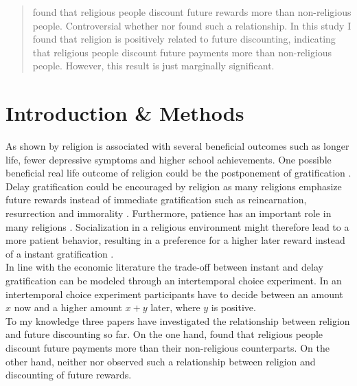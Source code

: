 \documentclass[10pt,a4paper]{article}
\begin{document}

\newpage



\begin{abstract}
\textcite{carter2012religious} found that religious people discount future rewards more than non-religious people. 
Controversial whether \textcite{thornton2015divine} nor \textcite{benjamin2010religious} found such a relationship. In this study I found that religion is positively related to future discounting, indicating that religious people discount future payments more than non-religious people. However, this result is just marginally significant.
\end{abstract}
 

\section{Introduction \& Methods}
As shown by \textcite{mccullough2013religion} religion is associated with several beneficial outcomes such as longer life, fewer depressive symptoms and higher school achievements. One possible beneficial real life outcome of religion could be the postponement of gratification \parencite{carter2012religious}. Delay gratification could be encouraged by religion as many religions emphasize future rewards instead of immediate gratification such as reincarnation, resurrection and immorality \parencite{carter2012religious}. Furthermore, patience has an important role in many religions \parencite{carter2012religious}. Socialization in a religious environment might therefore lead to a more patient behavior, resulting in a preference for a higher later reward instead of a instant gratification \parencite{carter2012religious}.\\
In line with the economic literature the trade-off between instant and delay gratification can be modeled through an intertemporal choice experiment. In an intertemporal choice experiment participants have to decide between an amount $x$ now and a higher amount $x+y$ later, where $y$ is positive.\\ 

To my knowledge three papers have investigated the relationship between religion and future discounting so far. On the one hand,\textcite{carter2012religious} found that religious people discount future payments more than their non-religious counterparts. On the other hand, neither \textcite{thornton2015divine} nor \textcite{benjamin2010religious} observed such a relationship between religion and discounting of future rewards.\\ 
\end{document}
